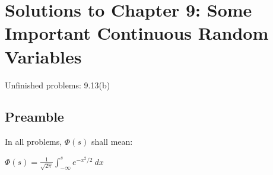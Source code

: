 \documentclass[10pt, oneside]{article}
\begin{document}
\newpage


\setcounter{cor}{0}
\setcounter{prop}{0}
\setcounter{cor*}{0}

{}
\section*{Solutions to Chapter 9: Some Important Continuous Random Variables}

Unfinished problems: 9.13(b)

{}
\subsection*{Preamble}

In all problems, $\Phi(s)$ shall mean:

$\Phi(s) = \frac{1}{\sqrt{2 \pi}} \int^s_{-\infty} e^{-x^2/2} \ dx$
\end{document}
